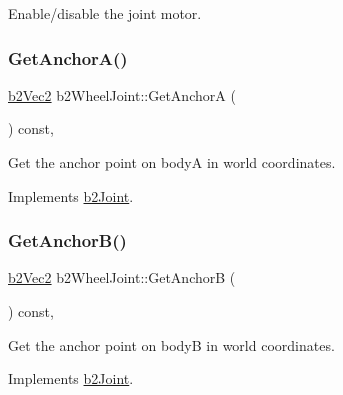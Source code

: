 Enable/disable the joint motor. 

\mbox{\label{classb2_wheel_joint_a43a301e48ba486278932c82d3a98abd8}} 
\subsubsection{\texorpdfstring{GetAnchorA()}{GetAnchorA()}}
{\footnotesize\ttfamily \mbox{\hyperlink{structb2_vec2}{b2\+Vec2}} b2\+Wheel\+Joint\+::\+Get\+AnchorA (\begin{DoxyParamCaption}{ }\end{DoxyParamCaption}) const\hspace{0.3cm}{\ttfamily [override]}, {\ttfamily [virtual]}}



Get the anchor point on bodyA in world coordinates. 



Implements \mbox{\hyperlink{classb2_joint_abe46ca3aad5db73909a9b5a7b2117447}{b2\+Joint}}.

\mbox{\label{classb2_wheel_joint_a62f450ad368793c3cde36404a39775e0}} 
\subsubsection{\texorpdfstring{GetAnchorB()}{GetAnchorB()}}
{\footnotesize\ttfamily \mbox{\hyperlink{structb2_vec2}{b2\+Vec2}} b2\+Wheel\+Joint\+::\+Get\+AnchorB (\begin{DoxyParamCaption}{ }\end{DoxyParamCaption}) const\hspace{0.3cm}{\ttfamily [override]}, {\ttfamily [virtual]}}



Get the anchor point on bodyB in world coordinates. 



Implements \mbox{\hyperlink{classb2_joint_a88e947c65d4ea26fe539f02a8cb7f7a9}{b2\+Joint}}.

\mbox{\label{classb2_wheel_joint_a3ea115dde9bad34d23fd59068734824a}} 
